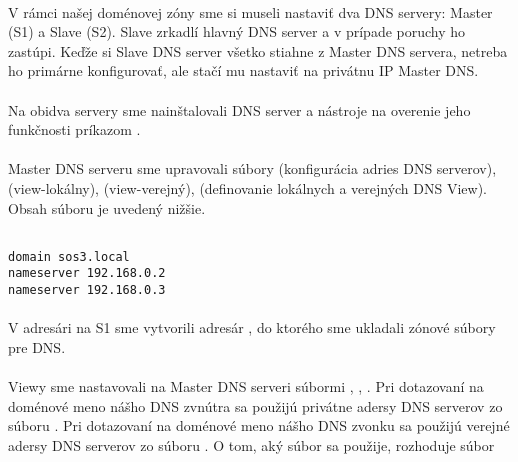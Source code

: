 \paragraph{}
V rámci našej doménovej zóny  sme si museli nastaviť dva DNS servery: Master (S1) a Slave (S2). Slave zrkadlí hlavný DNS server a v prípade poruchy ho zastúpi. Keďže si Slave DNS server všetko stiahne z Master DNS servera, netreba ho primárne konfigurovať, ale stačí mu  nastaviť  na privátnu IP Master DNS.
\paragraph{}
Na obidva servery sme nainštalovali DNS server a nástroje na overenie jeho funkčnosti príkazom .
\paragraph{}
Master DNS serveru sme upravovali súbory  (konfigurácia adries DNS serverov),  (view-lokálny),  (view-verejný),  (definovanie lokálnych a verejných DNS View). Obsah súboru  je uvedený nižšie.

\noindent
{\selectfont

\begin{small}

\begin{verbatim}

domain sos3.local
nameserver 192.168.0.2
nameserver 192.168.0.3

\end{verbatim}

\end{small}

}

\paragraph{}
V adresári  na S1 sme vytvorili adresár , do ktorého sme ukladali zónové súbory pre DNS.
\paragraph{}
Viewy sme nastavovali na Master  DNS serveri súbormi , , . Pri dotazovaní na doménové meno nášho DNS zvnútra sa použijú privátne adersy DNS serverov zo súboru . Pri dotazovaní na doménové meno nášho DNS zvonku sa použijú verejné adersy DNS serverov zo súboru . O tom, aký súbor sa použije, rozhoduje súbor 
